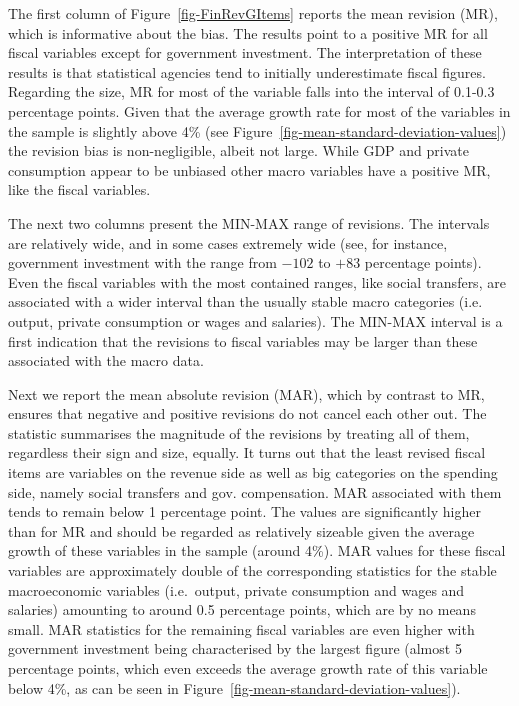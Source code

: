 \documentclass[
  letterpaper,
  authoryear,
  preprint,
  3p]{elsarticle}
\begin{document}
The first column of Figure~\ref{fig-FinRevGItems} reports the mean
revision (MR), which is informative about the bias. The results point to
a positive MR for all fiscal variables except for government investment.
The interpretation of these results is that statistical agencies tend to
initially underestimate fiscal figures. Regarding the size, MR for most
of the variable falls into the interval of 0.1-0.3 percentage points.
Given that the average growth rate for most of the variables in the
sample is slightly above 4\% (see
Figure~\ref{fig-mean-standard-deviation-values}) the revision bias is
non-negligible, albeit not large. While GDP and private consumption
appear to be unbiased other macro variables have a positive MR, like the
fiscal variables.

The next two columns present the MIN-MAX range of revisions. The
intervals are relatively wide, and in some cases extremely wide (see,
for instance, government investment with the range from \(-102\) to
\(+83\) percentage points). Even the fiscal variables with the most
contained ranges, like social transfers, are associated with a wider
interval than the usually stable macro categories (i.e. output, private
consumption or wages and salaries). The MIN-MAX interval is a first
indication that the revisions to fiscal variables may be larger than
these associated with the macro data.

Next we report the mean absolute revision (MAR), which by contrast to
MR, ensures that negative and positive revisions do not cancel each
other out. The statistic summarises the magnitude of the revisions by
treating all of them, regardless their sign and size, equally. It turns
out that the least revised fiscal items are variables on the revenue
side as well as big categories on the spending side, namely social
transfers and gov. compensation. MAR associated with them tends to
remain below 1 percentage point. The values are significantly higher
than for MR and should be regarded as relatively sizeable given the
average growth of these variables in the sample (around 4\%). MAR values
for these fiscal variables are approximately double of the corresponding
statistics for the stable macroeconomic variables (i.e.~output, private
consumption and wages and salaries) amounting to around 0.5 percentage
points, which are by no means small. MAR statistics for the remaining
fiscal variables are even higher with government investment being
characterised by the largest figure (almost 5 percentage points, which
even exceeds the average growth rate of this variable below 4\%, as can
be seen in Figure~\ref{fig-mean-standard-deviation-values}).
\end{document}
